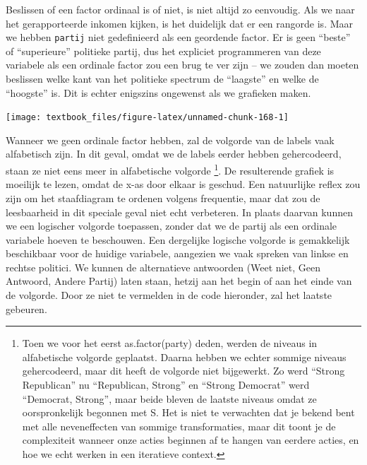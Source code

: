 \documentclass[]{tufte-book}
\newenvironment{Shaded}{}{}
\newcommand{\DataTypeTok}[1]{\textcolor[rgb]{0.56,0.13,0.00}{#1}}
\newcommand{\DecValTok}[1]{\textcolor[rgb]{0.25,0.63,0.44}{#1}}
\newcommand{\KeywordTok}[1]{\textcolor[rgb]{0.00,0.44,0.13}{\textbf{#1}}}
\newcommand{\NormalTok}[1]{#1}
\newcommand{\OperatorTok}[1]{\textcolor[rgb]{0.40,0.40,0.40}{#1}}
\newcommand{\StringTok}[1]{\textcolor[rgb]{0.25,0.44,0.63}{#1}}
\begin{document}
Beslissen of een factor ordinaal is of niet, is niet altijd zo eenvoudig. Als we naar het gerapporteerde inkomen kijken, is het duidelijk dat er een rangorde is. Maar we hebben \texttt{partij} niet gedefinieerd als een geordende factor. Er is geen ``beste'' of ``superieure'' politieke partij, dus het expliciet programmeren van deze variabele als een ordinale factor zou een brug te ver zijn -- we zouden dan moeten beslissen welke kant van het politieke spectrum de ``laagste'' en welke de ``hoogste'' is. Dit is echter enigszins ongewenst als we grafieken maken.

\begin{Shaded}
\end{Shaded}

\texttt{[image: textbook\_files/figure-latex/unnamed-chunk-168-1]}

Wanneer we geen ordinale factor hebben, zal de volgorde van de labels vaak alfabetisch zijn. In dit geval, omdat we de labels eerder hebben gehercodeerd, staan ze niet eens meer in alfabetische volgorde \footnote{Toen we voor het eerst as.factor(party) deden, werden de niveaus in alfabetische volgorde geplaatst. Daarna hebben we echter sommige niveaus gehercodeerd, maar dit heeft de volgorde niet bijgewerkt. Zo werd ``Strong Republican'' nu ``Republican, Strong'' en ``Strong Democrat'' werd ``Democrat, Strong'', maar beide bleven de laatste niveaus omdat ze oorspronkelijk begonnen met S. Het is niet te verwachten dat je bekend bent met alle neveneffecten van sommige transformaties, maar dit toont je de complexiteit wanneer onze acties beginnen af te hangen van eerdere acties, en hoe we echt werken in een iteratieve context.}. De resulterende grafiek is moeilijk te lezen, omdat de x-as door elkaar is geschud. Een natuurlijke reflex zou zijn om het staafdiagram te ordenen volgens frequentie, maar dat zou de leesbaarheid in dit speciale geval niet echt verbeteren. In plaats daarvan kunnen we een logischer volgorde toepassen, zonder dat we de partij als een ordinale variabele hoeven te beschouwen. Een dergelijke logische volgorde is gemakkelijk beschikbaar voor de huidige variabele, aangezien we vaak spreken van linkse en rechtse politici. We kunnen de alternatieve antwoorden (Weet niet, Geen Antwoord, Andere Partij) laten staan, hetzij aan het begin of aan het einde van de volgorde. Door ze niet te vermelden in de code hieronder, zal het laatste gebeuren.
\end{document}
